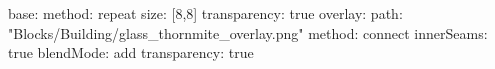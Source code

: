 base:
  method: repeat
  size: [8,8]
  transparency: true
overlay:
  path: "Blocks/Building/glass_thornmite_overlay.png"
  method: connect
  innerSeams: true
  blendMode: add
  transparency: true
